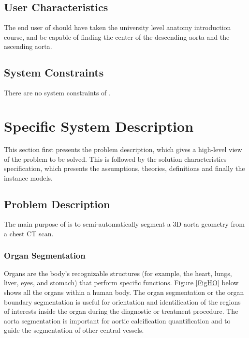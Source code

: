 \documentclass[12pt]{article}
\begin{document}
\subsection{User Characteristics} \label{SecUserCharacteristics}
The end user of \progname{} should have taken the university level anatomy introduction course, and be capable of finding the center of the descending aorta and the ascending aorta.

\subsection{System Constraints} \label{SecSysConstraints}
There are no system constraints of \progname{}.

\section{Specific System Description}

This section first presents the problem description, which gives a high-level
view of the problem to be solved.  This is followed by the solution characteristics
specification, which presents the assumptions, theories, definitions and finally
the instance models.  

\subsection{Problem Description} \label{Sec_pd}

The main purpose of \progname{} is to semi-automatically segment a 3D aorta geometry from a chest CT scan.

\subsubsection{Organ Segmentation}

Organs are the body's recognizable structures (for example, the heart, lungs, liver, eyes, and stomach) that perform specific functions. Figure \ref{FigHO} below shows all the organs within a human body. The organ segmentation or the organ boundary segmentation is useful for orientation and identification of the regions of interests inside the organ during the diagnostic or treatment procedure. The aorta segmentation is important for aortic calcification quantification and to guide the segmentation of other central vessels. \cite{TissuesAndOrgans}
\end{document}
